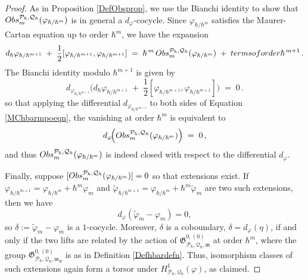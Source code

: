 \documentclass[10pt,a4paper]{amsart}
\newcommand{\Obs}{{\textup{Obs}}}
\newcommand{\Ph}{{\mathcal{P}_\hbar}}
\newcommand{\Qh}{{\mathcal{Q}_\hbar}}
\newcommand{\mc}{\mathcal}
\newcommand{\mf}{\mathfrak}
\begin{document}
\begin{proof}
As in Proposition \ref{DefObsprop}, we use the Bianchi identity to show that $\Obs_m^{\Ph,\Qh}(\varphi_{\hbar/\hbar^m})$ is in general a $d_\varphi$-cocycle. Since $\varphi_{\hbar/\hbar^m}$ satisfies the Maurer-Cartan equation up to order $\hbar^m$, we have the expansion 
\begin{equation}\label{MChbarmpoeqn}
	d_\hbar\varphi_{\hbar/\hbar^{m+1}} \;+\; \frac{1}{2}[\varphi_{\hbar/\hbar^{m+1}},\varphi_{\hbar/\hbar^{m+1}}] \;=\; \hbar^{\,m}\,\Obs_m^{\Ph,\Qh}(\varphi_{\hbar/\hbar^m}) \;+\; \textup{terms of order } \hbar^{\,m+1}\,.
\end{equation}
The Bianchi identity modulo $\hbar^{m+1}$ is given by
\[ 
d_{\varphi_{ \hbar / \hbar^{m+1}}}\!\Big(d_\hbar\varphi_{\hbar/\hbar^{m+1}} \;+\; \frac{1}{2}[\varphi_{\hbar/\hbar^{m+1}},\varphi_{\hbar/\hbar^{m+1}}] \Big) \;=\; 0\,.
\] 
so that applying the differential $d_{\varphi_{ \hbar / \hbar^{m+1}}}$ to both sides of Equation \ref{MChbarmpoeqn}, the vanishing at order $\hbar^m$ is equivalent to
\[ 
d_\varphi\!\Big(\Obs_m^{\Ph,\Qh}(\varphi_{\hbar/\hbar^m})\Big) \;=\; 0\,,
\] 
and thus $\Obs_m^{\Ph,\Qh}(\varphi_{\hbar/\hbar^m})$ is indeed closed with respect to the differential $d_\varphi$.


Finally, suppose $[\Obs_m^{\Ph,\Qh}(\varphi_{\hbar/\hbar^m})]=0$ so that extensions exist. If $\varphi_{\hbar/\hbar^{m+1}}=\varphi_{\hbar/\hbar^m}+\hbar^m\varphi_m$ and $\tilde\varphi_{\hbar/\hbar^{m+1}}=\varphi_{\hbar/\hbar^m}+\hbar^m\tilde \varphi_m$ are two such extensions, then we have
\[
d_\varphi(\tilde\varphi_m-\varphi_m)=0,
\]
so $\delta:=\tilde\varphi_m-\varphi_m$ is a $1$-cocycle. Moreover, $\delta$ is a coboundary, $\delta=d_\varphi(\eta)$, if and only if the two lifts are related by the action of
$\mf G^{0,(0)}_{\Ph,\Qh,\mf m}$ at order $\hbar^m$, where the group $\mf G^{0,(0)}_{\Ph,\Qh,\mf m_R}$ is as in Definition \ref{Defhbardefn}. Thus, isomorphism classes of such extensions again form a torsor under $H^1_{\mc P_0,\mc Q_0}(\varphi)$, as claimed.
\end{proof}
\end{document}
